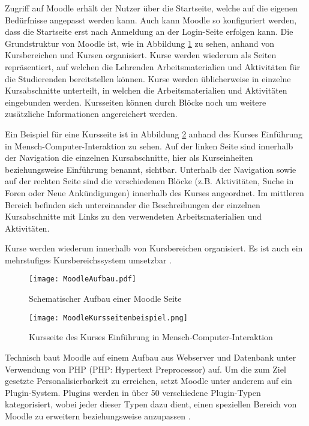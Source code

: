 Zugriff auf Moodle erhält der Nutzer über die Startseite, welche auf die eigenen Bedürfnisse angepasst werden kann. Auch kann Moodle so konfiguriert werden, dass die Startseite erst nach Anmeldung an der Login-Seite erfolgen kann. Die Grundstruktur von Moodle ist, wie in Abbildung \ref{fig:MoodleAufbau} zu sehen, anhand von Kursbereichen und Kursen organisiert. Kurse werden wiederum als Seiten repräsentiert, auf welchen die Lehrenden Arbeitsmaterialien und Aktivitäten für die Studierenden bereitstellen können. Kurse werden üblicherweise in einzelne Kursabschnitte unterteilt, in welchen die Arbeitsmaterialien und Aktivitäten eingebunden werden. Kursseiten können durch Blöcke noch um weitere zusätzliche Informationen angereichert werden.

Ein Beispiel für eine Kursseite ist in Abbildung \ref{fig:MoodleKursseitenbeispiel} anhand des Kurses \glqq Einführung in Mensch-Computer-Interaktion\grqq{} zu sehen. Auf der linken Seite sind innerhalb der Navigation die einzelnen Kursabschnitte, hier als Kurseinheiten beziehungsweise Einführung  benannt, sichtbar. Unterhalb der Navigation sowie auf der rechten Seite sind die verschiedenen Blöcke (z.B. \glqq Aktivitäten\grqq{}, \glqq Suche in Foren\grqq{} oder \glqq Neue Ankündigungen\grqq{}) innerhalb des Kurses angeordnet. Im mittleren Bereich befinden sich untereinander die Beschreibungen der einzelnen Kursabschnitte mit Links zu den verwendeten Arbeitsmaterialien und Aktivitäten.

Kurse werden wiederum innerhalb von Kursbereichen organisiert. Es ist auch ein mehrstufiges Kursbereichssystem umsetzbar \citep{moodle2015aufbau}.

\begin{figure}[h!]
\texttt{[image: MoodleAufbau.pdf]}
\caption{\label{fig:MoodleAufbau}Schematischer Aufbau einer Moodle Seite}
\end{figure}

\begin{figure}[h!]
\texttt{[image: MoodleKursseitenbeispiel.png]}
\caption{\label{fig:MoodleKursseitenbeispiel}Kursseite des Kurses \glqq Einführung in Mensch-Computer-Interaktion\grqq{} \citep{fernuniversitaet2018mensch}}
\end{figure}

Technisch baut Moodle auf einem Aufbau aus Webserver und Datenbank unter Verwendung von PHP (PHP: Hypertext Preprocessor) auf. Um die zum Ziel gesetzte Personalisierbarkeit zu erreichen, setzt Moodle unter anderem auf ein Plugin-System. Plugins werden in über 50 verschiedene Plugin-Typen kategorisiert, wobei jeder dieser Typen dazu dient, einen speziellen Bereich von Moodle zu erweitern beziehungsweise anzupassen \citep{moodle2017plugin}.


